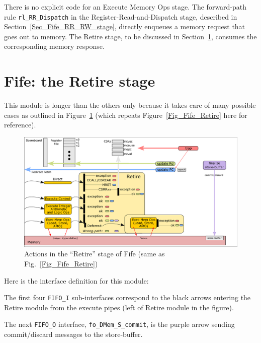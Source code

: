 There is no explicit code for an Execute Memory Ops stage.  The
forward-path rule \verb|rl_RR_Dispatch| in the
Register-Read-and-Dispatch stage, described in
Section~\ref{Sec_Fife_RR_RW_stage}, directly enqueues a memory request
that goes out to memory.  The Retire stage, to be discussed in
Section~\ref{Sec_Fife_Retire_code}, consumes the corresponding memory
response.


\section{Fife: the Retire stage}

\label{Sec_Fife_Retire_code}

This module is longer than the others only because it takes care of
many possible cases as outlined in Figure~\ref{Fig_Fife_Retire_2}
(which repeats Figure~\ref{Fig_Fife_Retire} here for reference).
\begin{figure}[htbp]
  \centerline{\includegraphics[width=6in,angle=0]{Figures/Fig_Retire_Layers_1_2}}
  \caption{\label{Fig_Fife_Retire_2}
           Actions in the ``Retire'' stage of Fife
	   (same as Fig.~\ref{Fig_Fife_Retire})}
\end{figure}

Here is the interface definition for this module:


The first four \verb|FIFO_I| sub-interfaces correspond to the black
arrows entering the Retire module from the execute pipes (left of
Retire module in the figure).

The next \verb|FIFO_O| interface, \verb|fo_DMem_S_commit|, is the
purple arrow sending commit/discard messages to the store-buffer.

